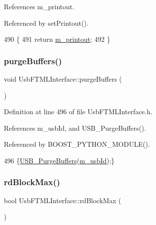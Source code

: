 References m\+\_\+printout.



Referenced by set\+Printout().


\begin{DoxyCode}
490                    \{
491     \textcolor{keywordflow}{return} \hyperlink{classUsbFTMLInterface_a57b909e50c9eba8ffbcb66e0d9649632}{m\_printout};
492   \}
\end{DoxyCode}
\mbox{\label{classUsbFTMLInterface_ad5c6964b2618149f33c258f896e9f113}} 
\subsubsection{\texorpdfstring{purge\+Buffers()}{purgeBuffers()}}
{\footnotesize\ttfamily void Usb\+F\+T\+M\+L\+Interface\+::purge\+Buffers (\begin{DoxyParamCaption}{ }\end{DoxyParamCaption})\hspace{0.3cm}{\ttfamily [inline]}}



Definition at line 496 of file Usb\+F\+T\+M\+L\+Interface.\+h.



References m\+\_\+usb\+Id, and U\+S\+B\+\_\+\+Purge\+Buffers().



Referenced by B\+O\+O\+S\+T\+\_\+\+P\+Y\+T\+H\+O\+N\+\_\+\+M\+O\+D\+U\+L\+E().


\begin{DoxyCode}
496 \{\hyperlink{LALUsbML_8h_ab28cf26b80d470d84681e4da8a38afd7}{USB\_PurgeBuffers}(\hyperlink{classUsbFTMLInterface_aab6754587c303660d5c498ce34a2b4c8}{m\_usbId});\}
\end{DoxyCode}
\mbox{\label{classUsbFTMLInterface_ac0a393da12305baa111deb699f7190cb}} 
\subsubsection{\texorpdfstring{rd\+Block\+Max()}{rdBlockMax()}}
{\footnotesize\ttfamily bool Usb\+F\+T\+M\+L\+Interface\+::rd\+Block\+Max (\begin{DoxyParamCaption}{ }\end{DoxyParamCaption})\hspace{0.3cm}{\ttfamily [inline]}}

